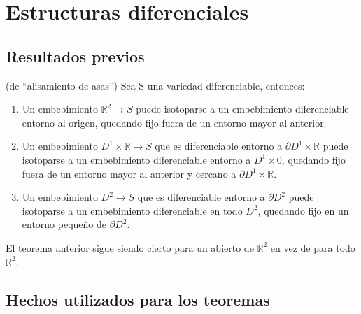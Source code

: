 
\chapter{Estructuras diferenciales}

\section{Resultados previos}

	\begin{teorema} (de ``alisamiento de asas'')
		Sea S una variedad diferenciable, entonces:
		\begin{enumerate}
			\item Un embebimiento $\mathbb{R}^2 \rightarrow S$ puede isotoparse a un embebimiento diferenciable entorno al origen, quedando fijo fuera de un entorno mayor al anterior.
			\item Un embebimiento $D^1\times\mathbb{R} \rightarrow S$ que es diferenciable entorno a $\partial D^1\times\mathbb{R}$ puede isotoparse a un embebimiento diferenciable entorno a $D^1\times 0$, quedando fijo fuera de un entorno mayor al anterior y cercano a $\partial D^1\times\mathbb{R}$.
			\item Un embebimiento $D^2 \rightarrow S$ que es diferenciable entorno a $\partial D^2$ puede isotoparse a un embebimiento diferenciable en todo $D^2$, quedando fijo en un entorno pequeño de $\partial D^2$.
		\end{enumerate}
	\end{teorema}
	
	\begin{corolario}
		El teorema anterior sigue siendo cierto para un abierto de $\mathbb{R}^2$ en vez de para todo $\mathbb{R}^2$.
	\end{corolario}


\section{Hechos utilizados para los teoremas}

\endinput
